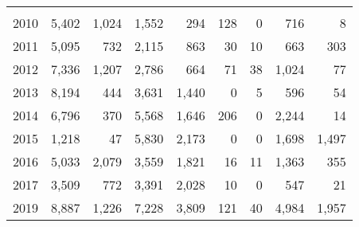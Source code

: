 \documentclass[
]{article}
\begin{document}
\begin{table}
\begin{tabular}[t]{lrrrrrrrr}
\addlinespace[0.3em]
\multicolumn{9}{l}{\textbf{Cape Simpson}}\\
\hspace{1em}\hspace{1em}\hspace{1em}\hspace{1em}2010 & 5,402 & 1,024 & 1,552 & 294 & 128 & 0 & 716 & 8\\
\hspace{1em}\hspace{1em}\hspace{1em}\hspace{1em}2011 & 5,095 & 732 & 2,115 & 863 & 30 & 10 & 663 & 303\\
\hspace{1em}\hspace{1em}\hspace{1em}\hspace{1em}2012 & 7,336 & 1,207 & 2,786 & 664 & 71 & 38 & 1,024 & 77\\
\hspace{1em}\hspace{1em}\hspace{1em}\hspace{1em}2013 & 8,194 & 444 & 3,631 & 1,440 & 0 & 5 & 596 & 54\\
\hspace{1em}\hspace{1em}\hspace{1em}\hspace{1em}2014 & 6,796 & 370 & 5,568 & 1,646 & 206 & 0 & 2,244 & 14\\
\hspace{1em}\hspace{1em}\hspace{1em}\hspace{1em}2015 & 1,218 & 47 & 5,830 & 2,173 & 0 & 0 & 1,698 & 1,497\\
\hspace{1em}\hspace{1em}\hspace{1em}\hspace{1em}2016 & 5,033 & 2,079 & 3,559 & 1,821 & 16 & 11 & 1,363 & 355\\
\hspace{1em}\hspace{1em}\hspace{1em}\hspace{1em}2017 & 3,509 & 772 & 3,391 & 2,028 & 10 & 0 & 547 & 21\\
\hspace{1em}\hspace{1em}\hspace{1em}\hspace{1em}2019 & 8,887 & 1,226 & 7,228 & 3,809 & 121 & 40 & 4,984 & 1,957\\
\bottomrule
\end{tabular}
\end{table}
\end{document}
